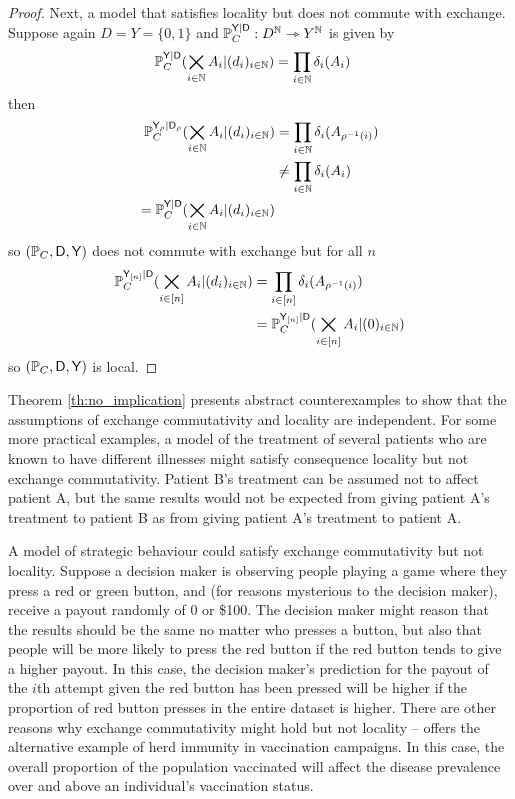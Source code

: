 \begin{proof}
Next, a model that satisfies locality but does not commute with exchange. Suppose again $D=Y=\{0,1\}$ and $\mathbb{P}_C^{\mathsf{Y}|\mathsf{D}}:D^{\mathbb{N}}\rightarrowtriangle Y^{\mathbb{N}}$ is given by
\begin{align}
    \mathbb{P}_C^{\mathsf{Y}|\mathsf{D}}(\bigtimes_{i\in\mathbb{N}} A_i |(d_i)_{i\in\mathbb{N}}) &= \prod_{i\in \mathbb{N}} \delta_i(A_i)
\end{align}
then
\begin{align}
    \mathbb{P}_C^{\mathsf{Y}_\rho|\mathsf{D}_\rho}(\bigtimes_{i\in\mathbb{N}} A_i |(d_i)_{i\in\mathbb{N}}) &= \prod_{i\in \mathbb{N}} \delta_i(A_{\rho^{-1}(i)})\\
    &\neq \prod_{i\in \mathbb{N}} \delta_i(A_{i})\\
    =\mathbb{P}_C^{\mathsf{Y}|\mathsf{D}}(\bigtimes_{i\in\mathbb{N}} A_i |(d_i)_{i\in\mathbb{N}})
\end{align}
so $(\mathbb{P}_C,\mathsf{D},\mathsf{Y})$ does not commute with exchange but for all $n$
\begin{align}
    \mathbb{P}_C^{\mathsf{Y}_{[n]}|\mathsf{D}}(\bigtimes_{i\in[n]} A_i |(d_i)_{i\in\mathbb{N}}) &= \prod_{i\in [n]} \delta_i(A_{\rho^{-1}(i)})\\
    &= \mathbb{P}_C^{\mathsf{Y}_{[n]}|\mathsf{D}}(\bigtimes_{i\in[n]} A_i |(0)_{i\in\mathbb{N}})
\end{align}
so $(\mathbb{P}_C,\mathsf{D},\mathsf{Y})$ is local.
\end{proof}

Theorem \ref{th:no_implication} presents abstract counterexamples to show that the assumptions of exchange commutativity and locality are independent. For some more practical examples, a model of the treatment of several patients who are known to have different illnesses might satisfy consequence locality but not exchange commutativity. Patient B's treatment can be assumed not to affect patient A, but the same results would not be expected from giving patient A's treatment to patient B as from giving patient A's treatment to patient A.

A model of strategic behaviour could satisfy exchange commutativity but not locality. Suppose a decision maker is observing people playing a game where they press a red or green button, and (for reasons mysterious to the decision maker), receive a payout randomly of 0 or \$100. The decision maker might reason that the results should be the same no matter who presses a button, but also that people will be more likely to press the red button if the red button tends to give a higher payout. In this case, the decision maker's prediction for the payout of the $i$th attempt given the red button has been pressed will be higher if the proportion of red button presses in the entire dataset is higher. There are other reasons why exchange commutativity might hold but not locality -- \citet{dawid_causal_2000} offers the alternative example of herd immunity in vaccination campaigns. In this case, the overall proportion of the population vaccinated will affect the disease prevalence over and above an individual's vaccination status.

